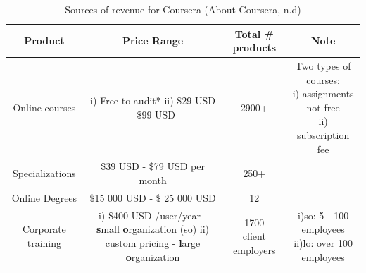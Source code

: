 \documentclass[11]{article}
\begin{document}
	\begin{table}
		\centering
		\begin{tabular}{|c|c|c|c|}
			\hline
				\textbf{Product} & \textbf{Price Range} & \textbf{Total \# products} & \textbf{Note} \\
			\hline
				Online courses & \makecell{i) Free to audit* \\ ii) \$29 USD - \$99 USD} & 2900+ & \makecell{Two types of courses:\\
																										i) assignments not free \\
																										ii) subscription fee } \\
			\hline
				Specializations & \makecell{\$39 USD - \$79 USD \\ per month} & 250+ & \\ 
			\hline
				Online Degrees & \$15 000 USD - \$ 25 000 USD & 12 & \\
			\hline
				Corporate training & \makecell{i) \$400 USD /user/year - \\ \textbf{s}mall \textbf{o}rganization (so)\\ ii) custom pricing - \\ \textbf{l}arge \textbf{o}rganization} & \makecell{1700 \\ client employers} &  \makecell{i)so: 5 - 100 employees\\ ii)lo: over 100 employees}\\
			\hline
		\end{tabular}	
		
		\caption{Sources of revenue for Coursera (About Coursera, n.d)}
		\label{revCoursera}
	\end{table}

\pagebreak
\end{document}
